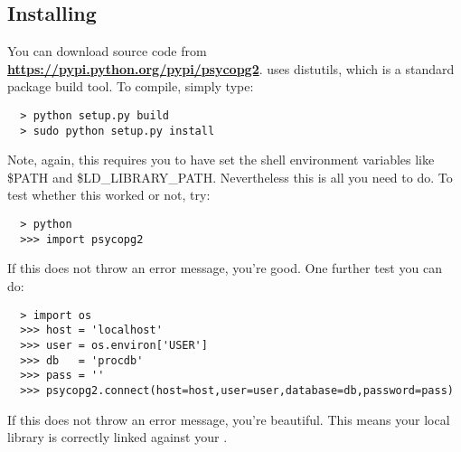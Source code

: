 \subsection{Installing {\psycopg}}

You can download {\psycopg} source code from 
\href{https://pypi.python.org/pypi/psycopg2}{\color{blue}\bf https://pypi.python.org/pypi/psycopg2}.
{} uses {\ttfamily distutils}, which is a standard {\python} package build tool.
To compile, simply type:
\begin{lstlisting}
  > python setup.py build
  > sudo python setup.py install
\end{lstlisting}
Note, again, this requires you to have set the shell environment variables like {\ttfamily \$PATH}
and {\ttfamily \$LD\_LIBRARY\_PATH}. Nevertheless this is all you need to do. To test whether this
worked or not, try:
\begin{lstlisting}
  > python
  >>> import psycopg2
\end{lstlisting}
If this does not throw an error message, you're good. One further test you can do:
\begin{lstlisting}
  > import os
  >>> host = 'localhost'
  >>> user = os.environ['USER']
  >>> db   = 'procdb'
  >>> pass = ''
  >>> psycopg2.connect(host=host,user=user,database=db,password=pass)
\end{lstlisting}
If this does not throw an error message, you're beautiful. This means your local {\psycopg}
library is correctly linked against your {\psql}.

